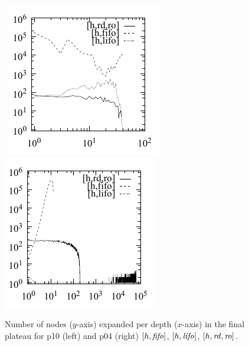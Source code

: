 \begin{figure}[tb]
 \centering {}
 \hbox{
 \includegraphics{tables/aaai16-log-rd/aaai16prelim3/depth-histogram-openstacks-opt11-strips-p10.pdf}
 \includegraphics{tables/aaai16-log-rd/2zerocost/depth-histogram-woodworking-cut-p04.pdf}
 }
 \caption{Number of nodes ($y$-axis) expanded per depth ($x$-axis) in
 the final plateau for 
  p10 
 (left)
 and
  p04
 (right)
 $[h,\mbox{\textit{fifo}}]$, $[h,\mbox{\textit{lifo}}]$, $[h,\mbox{\textit{rd}},\mbox{\textit{ro}}]$.
 }
 \label{depth-histogram}
\end{figure}


